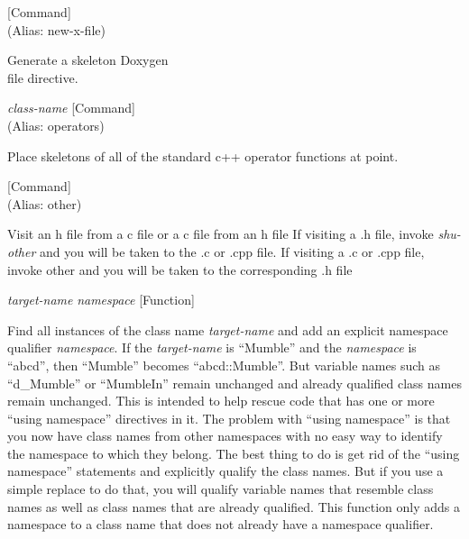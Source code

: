\vspace{1em}
\noindent
{}
\usebox{\funcname}
 \hfill [Command]\\%
 (Alias: new-x-file)

\begin{doc-string}
Generate a skeleton Doxygen \\file directive.
\end{doc-string}

\vspace{1em}
\noindent
{}
\usebox{\funcname}\emph{class-name}
 \hfill [Command]\\%
 (Alias: operators)

\begin{doc-string}
Place skeletons of all of the standard c++ operator functions at point.
\end{doc-string}

\vspace{1em}
\noindent
{}
\usebox{\funcname}
 \hfill [Command]\\%
 (Alias: other)

\begin{doc-string}
Visit an h file from a c file or a c file from an h file
If visiting a .h file, invoke \emph{shu-other} and you will be taken to the
.c or .cpp file.  If visiting a .c or .cpp file, invoke other and you
will be taken to the corresponding .h file
\end{doc-string}

\vspace{1em}
\noindent
{}
\usebox{\funcname}\emph{target-name} \emph{namespace}
 \hfill [Function]

\begin{doc-string}
Find all instances of the class name \emph{target-name} and add an explicit namespace
qualifier \emph{namespace}.  If the \emph{target-name} is ``Mumble'' and the \emph{namespace} is
``abcd'', then ``Mumble'' becomes ``abcd::Mumble''.  But variable names such
as ``d\_Mumble'' or ``MumbleIn'' remain unchanged and already qualified class
names remain unchanged.
This is intended to help rescue code that has one or more ``using namespace''
directives in it.  The problem with ``using namespace'' is that you now have
class names from other namespaces with no easy way to identify the namespace
to which they belong.  The best thing to do is get rid of the ``using
namespace'' statements and explicitly qualify the class names.  But if you
use a simple replace to do that, you will qualify variable names that resemble
class names as well as class names that are already qualified.  This function
only adds a namespace to a class name that does not already have a namespace
qualifier.
\end{doc-string}

